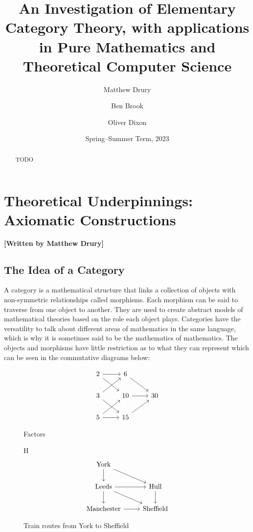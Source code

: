 \documentclass[10pt,a4paper,reqno]{amsart}
\title[An Investigation of Elementary Category Theory]{An Investigation of %
        Elementary Category Theory, with applications in Pure Mathematics and %
        Theoretical Computer Science}
\author{Matthew Drury} \email{\yorkemail{md1499}}
\author{Ben Brook}     \email{\yorkemail{bb1170}}
\author{Oliver Dixon}  \email{\yorkemail{od641}}
\date{Spring--Summer Term, 2023}
\numberwithin{figure}{section}
\begin{document}
\begin{abstract}
        TODO
\end{abstract}
\maketitle
\tableofcontents
\section{Theoretical %
        Underpinnings: Axiomatic Constructions}
\begin{flushright}
        \textbf{[Written by Matthew Drury]}
\end{flushright}


\subsection{The Idea of a Category}
A category is a mathematical structure that links a collection of objects with
non-symmetric relationships called morphisms. Each morphism can be said to
traverse from one object to another. They are used to create abstract models of
mathematical theories based on the role each object plays. Categories have the
versatility to talk about different areas of mathematics in the same language,
which is why it is sometimes said to be the mathematics of mathematics. The
objects and morphisms have little restriction as to what they can represent
which can be seen in the commutative diagrams below:
\begin{figure}[H]
        $$\begin{tikzcd}
                2 \ar[r] \ar[dr] & 6 \ar[dr]\\
                3 \ar[ur] \ar[dr] & 10 \ar[r] & 30\\
                5 \ar[ur] \ar[r] & 15 \ar[ur]
        \end{tikzcd}$$
\caption{Factors~\autocite{Cheng:2022}}
\end{figure}
\begin{figure}{H}
        $$\begin{tikzcd}
                \text{York} \ar[d] \ar[dr] \\
                \text{Leeds} \ar[d] \ar[dr] \ar[r] & \text{Hull} \ar[d] \\
                \text{Manchester} \ar[r] & \text{Sheffield}
        \end{tikzcd}$$
\caption{Train routes from York to Sheffield}
\end{figure}
\end{document}
